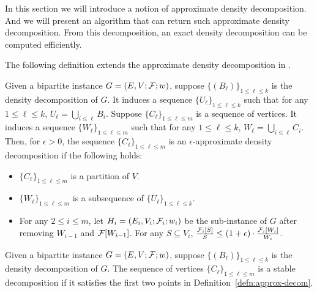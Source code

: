 {{%
	
In this section we will introduce a notion of approximate density decomposition. And we will present an algorithm that can return such approximate density decomposition. From this decomposition, an exact density decomposition can be computed efficiently. 

The following definition extends the approximate density decomposition in \cite{DBLP:conf/www/DanischCS17}. 

\begin{definition}\label{defn:approx-decom}
	Given a bipartite instance $G=(E, V; \mathcal {F}; w)$, suppose $\{(B_\ell)\}_{1\leq \ell \leq k}$ is the density decomposition of $G$. It induces a sequence $\{U_\ell\}_{1\leq \ell \leq k}$ such that for any $1\leq \ell \leq k$, $U_\ell = \bigcup_{i\leq \ell}B_i$. 
	Suppose $\{C_\ell\}_{1\leq \ell \leq m}$ is a sequence of vertices. It induces a sequence $\{W_\ell\}_{1\leq \ell \leq m}$ such that for any $1\leq \ell \leq k$, $W_\ell = \bigcup_{i\leq \ell}C_i$. 
	 Then, for $\epsilon > 0$, the sequence $\{C_\ell\}_{1\leq \ell \leq m}$ is an $\epsilon$-approximate density decomposition if the following holds: 
	 \begin{itemize}
	 	\item $\{C_\ell\}_{1\leq \ell \leq m}$ is a partition of $V$. 
	 	\item $\{W_\ell\}_{1\leq \ell \leq m}$ is a subsequence of $\{U_\ell\}_{1\leq \ell \leq k}$. 
	 	\item For any $2 \leq i \leq m$, let $H_i = (E_i, V_i; \mathcal {F}_i; w_i)$ be the sub-instance of $G$ after removing $W_{i-1}$ and $\mathcal {F}[W_{i-1}]$. For any $S \subseteq V_i$, $\frac{\mathcal {F}_i[S]}{S} \leq (1+\epsilon)\cdot \frac{\mathcal {F}_i[W_i]}{W_i}$.
	 \end{itemize}
\end{definition}

\begin{definition}
	Given a bipartite instance $G=(E, V; \mathcal {F}; w)$, suppose $\{(B_\ell)\}_{1\leq \ell \leq k}$ is the density decomposition of $G$. 
	The sequence of vertices $\{C_\ell\}_{1\leq \ell \leq m}$ is a stable decomposition if it satisfies the first two points in Definition~\ref{defn:approx-decom}. 
\end{definition}

}}
